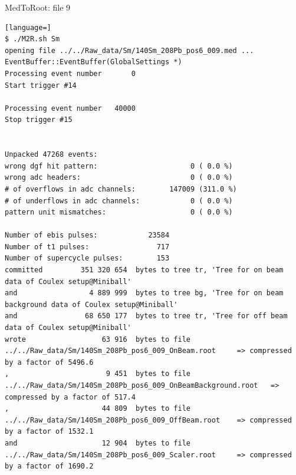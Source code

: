 \documentclass[twoside,english]{uiofysmaster/uiofysmaster}
\begin{document}
\bigskip

MedToRoot: file 9
\begin{lstlisting}[language=] 
$ ./M2R.sh Sm
opening file ../../Raw_data/Sm/140Sm_208Pb_pos6_009.med ...
EventBuffer::EventBuffer(GlobalSettings *)
Processing event number       0
Start trigger #14

Processing event number   40000
Stop trigger #15


Unpacked 47268 events:
wrong dgf hit pattern:                      0 ( 0.0 %)
wrong adc headers:                          0 ( 0.0 %)
# of overflows in adc channels:        147009 (311.0 %)
# of underflows in adc channels:            0 ( 0.0 %)
pattern unit mismatches:                    0 ( 0.0 %)

Number of ebis pulses:            23584
Number of t1 pulses:                717
Number of supercycle pulses:        153
committed         351 320 654  bytes to tree tr, 'Tree for on beam data of Coulex setup@Miniball'
and                 4 889 999  bytes to tree bg, 'Tree for on beam background data of Coulex setup@Miniball'
and                68 650 177  bytes to tree tr, 'Tree for off beam data of Coulex setup@Miniball'
wrote                  63 916  bytes to file ../../Raw_data/Sm/140Sm_208Pb_pos6_009_OnBeam.root 	=> compressed by a factor of 5496.6
,                       9 451  bytes to file ../../Raw_data/Sm/140Sm_208Pb_pos6_009_OnBeamBackground.root 	=> compressed by a factor of 517.4
,                      44 809  bytes to file ../../Raw_data/Sm/140Sm_208Pb_pos6_009_OffBeam.root 	=> compressed by a factor of 1532.1
and                    12 904  bytes to file ../../Raw_data/Sm/140Sm_208Pb_pos6_009_Scaler.root 	=> compressed by a factor of 1690.2
\end{lstlisting}
\end{document}
